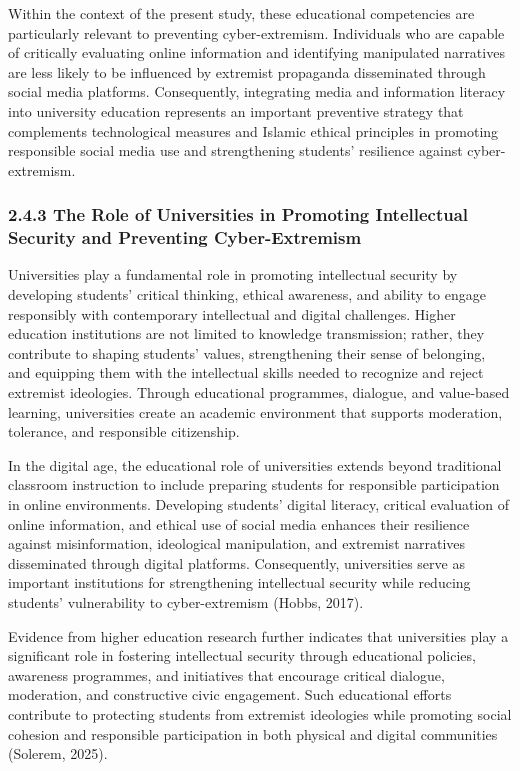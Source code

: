 \documentclass[10pt]{NSP1}
\begin{document}
	Within the context of the present study, these educational competencies are particularly relevant to preventing cyber-extremism. Individuals who are capable of critically evaluating online information and identifying manipulated narratives are less likely to be influenced by extremist propaganda disseminated through social media platforms. Consequently, integrating media and information literacy into university education represents an important preventive strategy that complements technological measures and Islamic ethical principles in promoting responsible social media use and strengthening students' resilience against cyber-extremism.
	
	\subsubsection*{2.4.3 The Role of Universities in Promoting Intellectual Security and Preventing Cyber-Extremism}
	
	Universities play a fundamental role in promoting intellectual security by developing students' critical thinking, ethical awareness, and ability to engage responsibly with contemporary intellectual and digital challenges. Higher education institutions are not limited to knowledge transmission; rather, they contribute to shaping students' values, strengthening their sense of belonging, and equipping them with the intellectual skills needed to recognize and reject extremist ideologies. Through educational programmes, dialogue, and value-based learning, universities create an academic environment that supports moderation, tolerance, and responsible citizenship.
	
	In the digital age, the educational role of universities extends beyond traditional classroom instruction to include preparing students for responsible participation in online environments. Developing students' digital literacy, critical evaluation of online information, and ethical use of social media enhances their resilience against misinformation, ideological manipulation, and extremist narratives disseminated through digital platforms. Consequently, universities serve as important institutions for strengthening intellectual security while reducing students' vulnerability to cyber-extremism (Hobbs, 2017).
	
	Evidence from higher education research further indicates that universities play a significant role in fostering intellectual security through educational policies, awareness programmes, and initiatives that encourage critical dialogue, moderation, and constructive civic engagement. Such educational efforts contribute to protecting students from extremist ideologies while promoting social cohesion and responsible participation in both physical and digital communities (Solerem, 2025).
	
\end{document}
